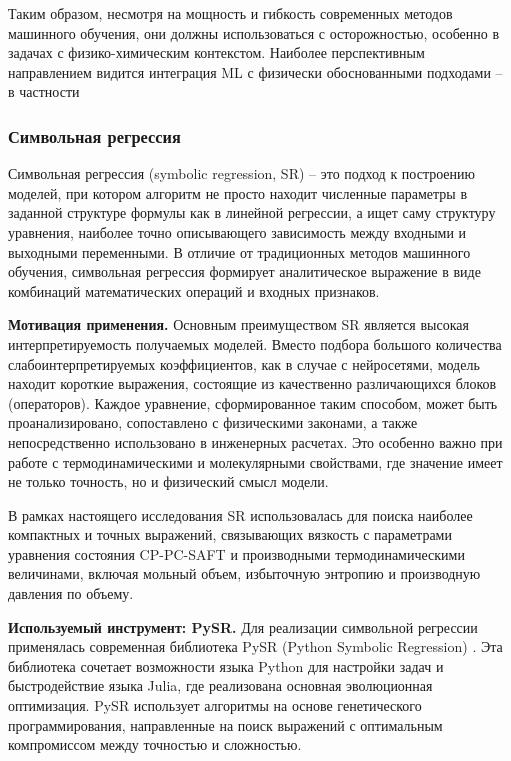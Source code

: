 \documentclass[a4paper,12pt]{article}
\begin{document}
Таким образом, несмотря на мощность и гибкость современных методов машинного обучения, они должны использоваться с осторожностью, особенно в задачах с физико-химическим контекстом. Наиболее перспективным направлением видится интеграция ML с физически обоснованными подходами -- в частности

\subsubsection{Символьная регрессия}

Символьная регрессия (symbolic regression, SR) -- это подход к построению моделей, при котором алгоритм не просто находит численные параметры в заданной структуре формулы как в линейной регрессии, а ищет саму структуру уравнения, наиболее точно описывающего зависимость между входными и выходными переменными. В отличие от традиционных методов машинного обучения, символьная регрессия формирует аналитическое выражение в виде комбинаций математических операций и входных признаков.

\textbf{Мотивация применения.}
Основным преимуществом SR является высокая интерпретируемость получаемых моделей. Вместо подбора большого количества слабоинтерпретируемых коэффициентов, как в случае с нейросетями, модель находит короткие выражения, состоящие из качественно различающихся блоков (операторов). Каждое уравнение, сформированное таким способом, может быть проанализировано, сопоставлено с физическими законами, а также непосредственно использовано в инженерных расчетах. Это особенно важно при работе с термодинамическими и молекулярными свойствами, где значение имеет не только точность, но и физический смысл модели.

В рамках настоящего исследования SR использовалась для поиска наиболее компактных и точных выражений, связывающих вязкость с параметрами уравнения состояния CP-PC-SAFT и производными термодинамическими величинами, включая мольный объем, избыточную энтропию и производную давления по объему.

\textbf{Используемый инструмент: PySR.}
Для реализации символьной регрессии применялась современная библиотека PySR (Python Symbolic Regression) \cite{cranmer2023pysr}. Эта библиотека сочетает возможности языка Python для настройки задач и быстродействие языка Julia, где реализована основная эволюционная оптимизация. PySR использует алгоритмы на основе генетического программирования, направленные на поиск выражений с оптимальным компромиссом между точностью и сложностью.
\end{document}
